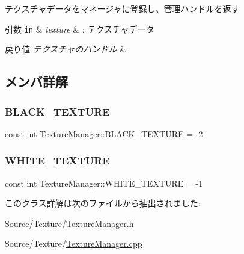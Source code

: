 テクスチャデータをマネージャに登録し、管理ハンドルを返す 
\begin{DoxyParams}[1]{引数}
\mbox{\tt in}  & {\em texture} & \+: テクスチャデータ \\
\hline
\end{DoxyParams}

\begin{DoxyRetVals}{戻り値}
{\em テクスチャのハンドル} & \\
\hline
\end{DoxyRetVals}


\subsection{メンバ詳解}
\mbox{\label{class_texture_manager_ab31a360ffca7a7a9115361580fc2e558}} 
\subsubsection{\texorpdfstring{B\+L\+A\+C\+K\+\_\+\+T\+E\+X\+T\+U\+RE}{BLACK\_TEXTURE}}
{\footnotesize\ttfamily const int Texture\+Manager\+::\+B\+L\+A\+C\+K\+\_\+\+T\+E\+X\+T\+U\+RE = -\/2\hspace{0.3cm}{\ttfamily [static]}}

\mbox{\label{class_texture_manager_a3fb17a5c43751276c5071cf6212b740c}} 
\subsubsection{\texorpdfstring{W\+H\+I\+T\+E\+\_\+\+T\+E\+X\+T\+U\+RE}{WHITE\_TEXTURE}}
{\footnotesize\ttfamily const int Texture\+Manager\+::\+W\+H\+I\+T\+E\+\_\+\+T\+E\+X\+T\+U\+RE = -\/1\hspace{0.3cm}{\ttfamily [static]}}



このクラス詳解は次のファイルから抽出されました\+:\begin{DoxyCompactItemize}
\item 
Source/\+Texture/\mbox{\hyperlink{_texture_manager_8h}{Texture\+Manager.\+h}}\item 
Source/\+Texture/\mbox{\hyperlink{_texture_manager_8cpp}{Texture\+Manager.\+cpp}}\end{DoxyCompactItemize}
